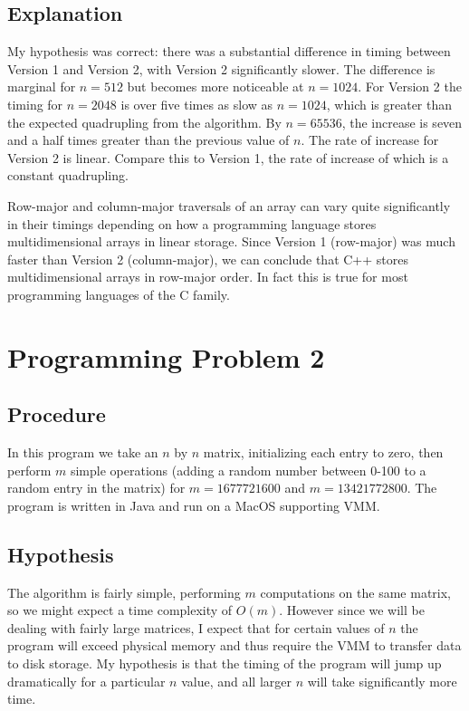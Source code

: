 \documentclass[11pt]{article}
\begin{document}
\subsection*{Explanation}

My hypothesis was correct: there was a substantial difference in timing between Version 1 and Version 2, with Version 2 significantly slower. The difference is marginal for $n=512$ but becomes more noticeable at $n=1024$. For Version 2 the timing for $n=2048$ is over five times as slow as $n=1024$, which is greater than the expected quadrupling from the algorithm. By $n=65536$, the increase is seven and a half times greater than the previous value of $n$. The rate of increase for Version 2 is linear. Compare this to Version 1, the rate of increase of which is a constant quadrupling.

Row-major and column-major traversals of an array can vary quite significantly in their timings depending on how a programming language stores multidimensional arrays in linear storage. Since Version 1 (row-major) was much faster than Version 2 (column-major), we can conclude that C++ stores multidimensional arrays in row-major order. In fact this is true for most programming languages of the C family.

\section*{Programming Problem 2}

\subsection*{Procedure}

In this program we take an $n$ by $n$ matrix, initializing each entry to zero, then perform $m$ simple operations (adding a random number between 0-100 to a random entry in the matrix) for $m = 1677721600$ and $m = 13421772800$. The program is written in Java and run on a MacOS supporting VMM.

\subsection*{Hypothesis}

The algorithm is fairly simple, performing $m$ computations on the same matrix, so we might expect a time complexity of $O(m)$. However since we will be dealing with fairly large matrices, I expect that for certain values of $n$ the program will exceed physical memory and thus require the VMM to transfer data to disk storage. My hypothesis is that the timing of the program will jump up dramatically for a particular $n$ value, and all larger $n$ will take significantly more time.
\end{document}
